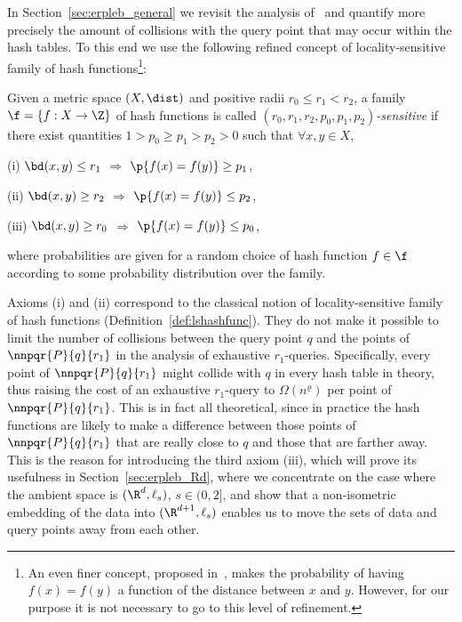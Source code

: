 In Section~\ref{sec:erpleb_general} we revisit the analysis
of~\cite[Chapters~1 and~3]{SDI05} and quantify more precisely the
amount of collisions with the query point that may occur within the
hash tables. To this end we use the following refined concept of
locality-sensitive family of hash functions\footnote{An even finer
  concept, proposed in~\cite[\textsection~3.3]{SDI05}, makes the
  probability of having $f(x)=f(y)$ a function of the distance between
  $x$ and $y$. However, for our purpose it is not necessary to go to
  this level of refinement.}:
\begin{defn}\label{def:stronglshashfunc}
  Given a metric space $(X,\dist)$ and positive radii $r_0\leq
  r_1<r_2$, a family $\f=\{f:X\rightarrow \Z\}$ of hash functions is
  called {\em $(r_0,r_1,r_2,p_0,p_1,p_2)$-sensitive} if there exist
  quantities $1>p_0\geq p_1>p_2 > 0$ such that $\forall x,y\in X$,
  \begin{slist}
  \item[\rm (i)] $\bd(x,y)\leq r_1$ $\Rightarrow$ $\p{f(x)=f(y)}\geq p_1$,
  \item[\rm (ii)] $\bd(x,y)\geq r_2$ $\Rightarrow$ $\p{f(x)=f(y)}\leq p_2$,
  \item[\rm (iii)] $\bd(x,y)\geq r_0$ $\Rightarrow$ $\p{f(x)=f(y)}\leq p_0$,
  \end{slist}
  where probabilities are given for a random choice of hash function
  $f\in \f$ according to some probability distribution
  over the family.
\end{defn}
Axioms (i) and (ii) correspond to the classical notion of
locality-sensitive family of hash functions
(Definition~\ref{def:lshashfunc}). They do not make it possible to
limit the number of collisions between the query point $q$ and the
points of $\nnpqr{P}{q}{r_1}$ in the analysis of exhaustive
$r_1$-\pleb queries. Specifically, every point of $\nnpqr{P}{q}{r_1}$
might collide with $q$ in every hash table in theory, thus raising the
cost of an exhaustive $r_1$-\pleb query to $\Omega(n^\varrho)$ per
point of $\nnpqr{P}{q}{r_1}$. This is in fact all theoretical, since
in practice the hash functions are likely to make a difference between
those points of $\nnpqr{P}{q}{r_1}$ that are really close to $q$ and
those that are farther away. This is the reason for introducing the
third axiom (iii), which will prove its usefulness in
Section~\ref{sec:erpleb_Rd}, where we concentrate on the case where
the ambient space is $(\R^d, \ell_s)$, $s\in (0,2]$, and show that a
non-isometric embedding of the data into $(\R^{d+1}, \ell_s)$ enables
us to move the sets of data and query points away from each other.


